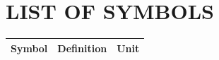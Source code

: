 \chapter*{LIST OF SYMBOLS}

\begin{longtable}{@{}>{\raggedright\arraybackslash}p{}p{}p{}@{}}
\toprule
\textbf{Symbol} & \textbf{Definition} & \textbf{Unit} \\
\midrule
\endhead
\bottomrule
\end{longtable}
